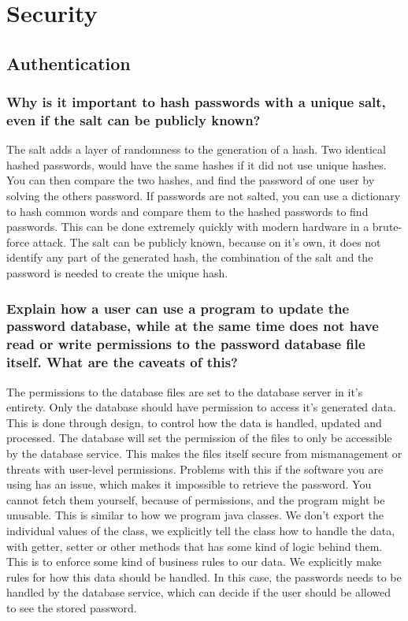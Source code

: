 \documentclass[a4paper]{article}
\begin{document}
\section{Security}
\subsection{Authentication}
\subsubsection{Why is it important to hash passwords with a unique salt, even if the salt can be publicly known?}

The salt adds a layer of randomness to the generation of a hash. Two identical hashed passwords, would have the same hashes if it did not use unique hashes. You can then compare the two hashes, and find the password of one user by solving the others password. If passwords are not salted, you can use a dictionary to hash common words and compare them to the hashed passwords to find passwords. This can be done extremely quickly with modern hardware in a brute-force attack. The salt can be publicly known, because on it's own, it does not identify any part of the generated hash, the combination of the salt and the password is needed to create the unique hash.  


\subsubsection{Explain how a user can use a program to update the password database, while at the same time does not have read or write permissions to the password database file itself. What are the caveats of this?}

The permissions to the database files are set to the database server in it's entirety. Only the database should have permission to access it's generated data. This is done through design, to control how the data is handled, updated and processed. The database will set the permission of the files to only be accessible by the database service. This makes the files itself secure from mismanagement or threats with user-level permissions. Problems with this if the software you are using has an issue, which makes it impossible to retrieve the password. You cannot fetch them yourself, because of permissions, and the program might be unusable. This is similar to how we program java classes. We don't export the individual values of the class, we explicitly tell the class how to handle the data, with getter, setter or other methods that has some kind of logic behind them. This is to enforce some kind of business rules to our data. We explicitly make rules for how this data should be handled. In this case, the passwords needs to be handled by the database service, which can decide if the user should be allowed to see the stored password.
\end{document}
